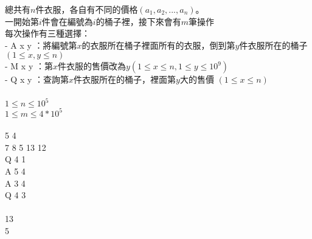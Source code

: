 總共有$n$件衣服，各自有不同的價格$(a_1, a_2, ..., a_n)$。\\
一開始第$i$件會在編號為$i$的桶子裡，接下來會有$m$筆操作\\
每次操作有三種選擇：\\
- A x y ：將編號第$x$的衣服所在桶子裡面所有的衣服，倒到第$y$件衣服所在的桶子 $(1 ≤ x, y ≤ n)$\\
- M x y ：第$x$件衣服的售價改為$y (1 ≤ x ≤ n, 1 ≤ y ≤ 10^9)$\\
- Q x y ：查詢第$x$件衣服所在的桶子，裡面第$y$大的售價 $(1 ≤ x ≤ n)$\\
\\
$1 ≤ n ≤ 10^5$\\
$1 ≤ m ≤ 4 * 10^5$\\
\\
5 4\\
7 8 5 13 12\\
Q 4 1\\
A 5 4\\
A 3 4\\
Q 4 3\\
\\
13\\
5\\